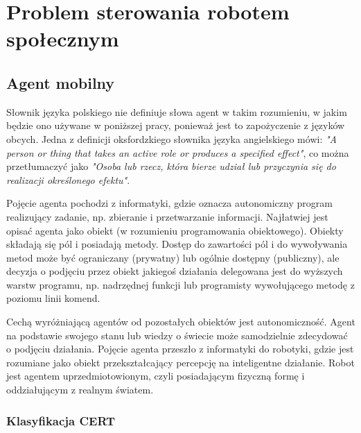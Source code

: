 \chapter{Problem sterowania robotem społecznym}

\section{Agent mobilny}
Słownik języka polskiego nie definiuje słowa agent w takim rozumieniu, w jakim będzie ono używane w poniższej pracy, ponieważ jest to zapożyczenie z języków obcych. Jedna z definicji oksfordzkiego słownika języka angielskiego mówi: \textit{"A person or thing that takes an active role or produces a specified effect"}, co można przetłumaczyć jako \textit{"Osoba lub rzecz, która bierze udział lub przyczynia się do realizacji określonego efektu"}. 

Pojęcie agenta pochodzi z informatyki, gdzie oznacza autonomiczny program realizujący zadanie, np. zbieranie i przetwarzanie informacji.
Najłatwiej jest opisać agenta jako obiekt (w rozumieniu programowania obiektowego). Obiekty składają się pól i posiadają metody. Dostęp do zawartości pól i do wywoływania metod może być ograniczany (prywatny) lub ogólnie dostępny (publiczny), ale decyzja o podjęciu przez obiekt jakiegoś działania delegowana jest do wyższych warstw programu, np. nadrzędnej funkcji lub programisty wywołującego metodę z poziomu linii komend. 

Cechą wyróżniającą agentów od pozostałych obiektów jest autonomiczność. Agent na podstawie swojego stanu lub wiedzy o świecie może samodzielnie zdecydować o podjęciu działania. Pojęcie agenta przeszło z informatyki do robotyki, gdzie jest rozumiane jako obiekt przekształcający percepcję na inteligentne działanie. Robot jest agentem uprzedmiotowionym, czyli posiadającym fizyczną formę i oddziałującym z realnym światem.

\subsection{Klasyfikacja CERT}


